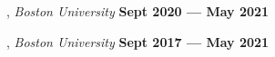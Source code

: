 
, \textit{Boston University}	\hfill {\bfseries Sept 2020 --- May 2021}

, \textit{Boston University} \hfill	{\bfseries Sept 2017 --- May 2021}


